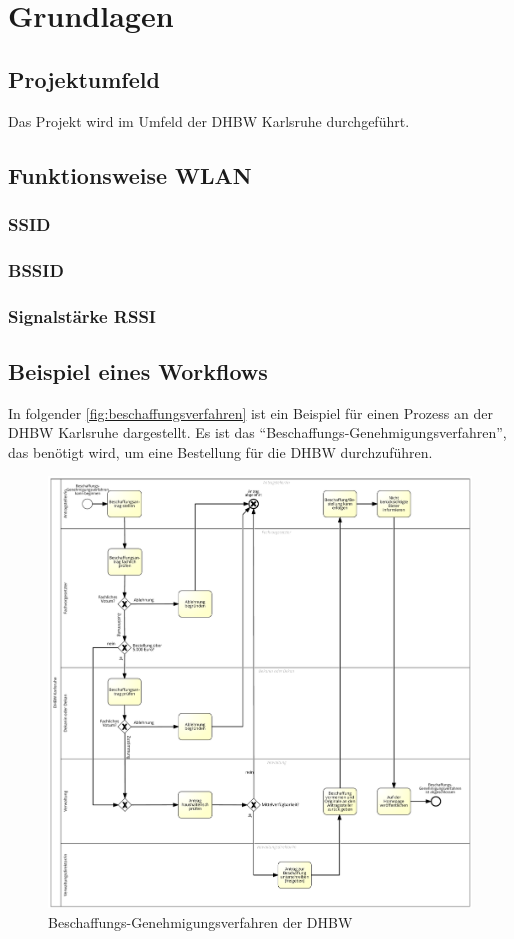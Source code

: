 \chapter{Grundlagen}

\section{Projektumfeld}

Das Projekt wird im Umfeld der \gls{DHBW} Karlsruhe durchgeführt.

\section{Funktionsweise WLAN}

\subsection{SSID}

\subsection{BSSID}

\subsection{Signalstärke RSSI}

\section{Beispiel eines Workflows}

In folgender \autoref{fig:beschaffungsverfahren} ist ein Beispiel für einen Prozess an der \gls{DHBW} Karlsruhe dargestellt.
Es ist das \enquote{Beschaffungs-Genehmigungsverfahren}, das benötigt wird, um eine Bestellung für die \gls{DHBW} durchzuführen.

\begin{figure}
	\includegraphics[width=\textwidth]{images/beschaffungs-genehmigungsverfahren.png} 
	\centering
	\caption{Beschaffungs-Genehmigungsverfahren der \gls{DHBW}}
	\label{fig:beschaffungsverfahren}
\end{figure} 

